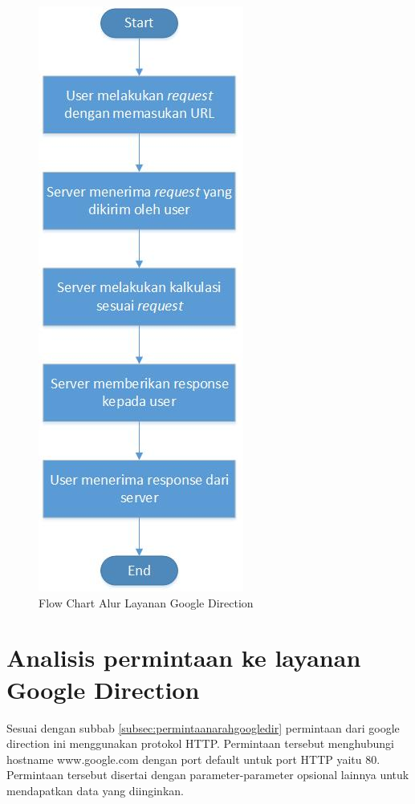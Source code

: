 			\begin{figure}[H]
				\centering		
				\includegraphics[scale=0.5]{Gambar/flowchartgoogledir.jpg}
				\caption[Flow Chart Alur Layanan Google Direction]{Flow Chart Alur Layanan Google Direction}
				\label{fig:flowchartgoogledir}	
			\end{figure}
			
\section{Analisis permintaan ke layanan Google Direction}
\label{sec:analisisrequestgoogledir}

Sesuai dengan subbab \ref{subsec:permintaanarahgoogledir} permintaan dari google direction ini menggunakan protokol HTTP. Permintaan tersebut menghubungi hostname www.google.com dengan port default untuk port HTTP yaitu 80. Permintaan tersebut disertai dengan parameter-parameter opsional lainnya untuk mendapatkan data yang diinginkan.

